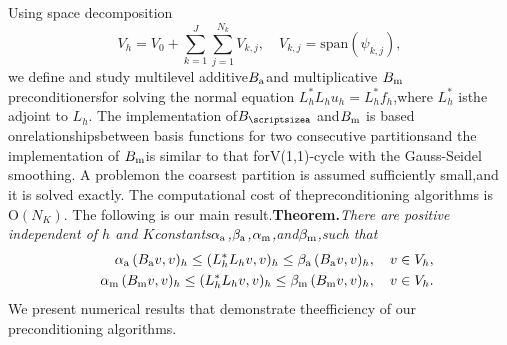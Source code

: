 \documentclass{report}
\begin{document}
Using space decomposition\[V_h=V_0+\sum_{k=1}^{J}\sum_{j=1}^{N_k}V_{k,j},\quad V_{k,j}= \mbox{span}(\psi_{k,j}),\]we define and study multilevel additive$B_{\textup{\scriptsize a}}$and multiplicative $B_{\textup{\scriptsize m}}$preconditionersfor solving the normal equation $L_h^*L_hu_h=L_h^*f_h$,where $L_h^*$ isthe adjoint to $L_h$.
The implementation of$B_{\textup{\scriptsizea}}$ and$B_{\textup{\scriptsize m}}$ is based onrelationshipsbetween basis functions for two consecutive partitionsand the implementation of $B_{\textup{\scriptsize m}}$is similar to that forV(1,1)-cycle with the Gauss-Seidel smoothing.
A problemon the coarsest partition is assumed sufficiently small,and it is solved exactly.
The computational cost of thepreconditioning algorithms is$\mbox{O}(N_K)$.
The following is our main result.\textbf{Theorem.}{\em There are positive independent of $h$ and $K$constants$\alpha_{\textup{\scriptsize a}}$,$\beta_{\textup{\scriptsize a}}$,$\alpha_{\textup{\scriptsize m}}$,and$\beta_{\textup{\scriptsize m}}$,such that}\begin{eqnarray}\label{eq:spectral_equiv}&&\alpha_{\textup{\scriptsize a}}\,(B_{\textup{\scriptsize a}}v,v)_h\leq (L_h^*L_hv,v)_h \leq\beta_{\textup{\scriptsize a}}\,(B_{\textup{\scriptsize a}}v,v)_h,\quad v\in V_h,\\\nonumber&&\alpha_{\textup{\scriptsize m}}\,(B_{\textup{\scriptsize m}}v,v)_h\leq (L_h^*L_hv,v)_h \leq\beta_{\textup{\scriptsize m}}\,(B_{\textup{\scriptsize m}}v,v)_h,\quad v\in V_h.\end{eqnarray}We present numerical results that demonstrate theefficiency of our preconditioning algorithms.
\end{document}
